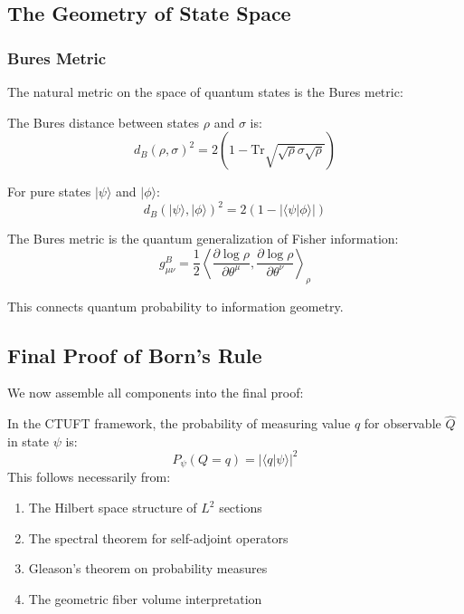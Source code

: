 \subsection{The Geometry of State Space}

\subsubsection{Bures Metric}

The natural metric on the space of quantum states is the Bures metric:

\begin{definition}
The Bures distance between states $\rho$ and $\sigma$ is:
\begin{equation}
    d_B(\rho, \sigma)^2 = 2\left(1 - \text{Tr}\sqrt{\sqrt{\rho}\sigma\sqrt{\rho}}\right)
\end{equation}
\end{definition}

For pure states $|\psi\rangle$ and $|\phi\rangle$:
\begin{equation}
    d_B(|\psi\rangle, |\phi\rangle)^2 = 2(1 - |\langle\psi|\phi\rangle|)
\end{equation}

\begin{theorem}
The Bures metric is the quantum generalization of Fisher information:
\begin{equation}
    g_{\mu\nu}^B = \frac{1}{2}\left\langle \frac{\partial \log\rho}{\partial \theta^\mu}, \frac{\partial \log\rho}{\partial \theta^\nu} \right\rangle_\rho
\end{equation}
\end{theorem}

This connects quantum probability to information geometry.

\subsection{Final Proof of Born's Rule}

We now assemble all components into the final proof:

\begin{theorem}
In the CTUFT framework, the probability of measuring value $q$ for observable $\hat{Q}$ in state $\psi$ is:
\begin{equation}
    P_\psi(Q = q) = |\langle q|\psi\rangle|^2
\end{equation}
This follows necessarily from:
\begin{enumerate}
    \item The Hilbert space structure of $L^2$ sections
    \item The spectral theorem for self-adjoint operators
    \item Gleason's theorem on probability measures
    \item The geometric fiber volume interpretation
\end{enumerate}
\end{theorem}

